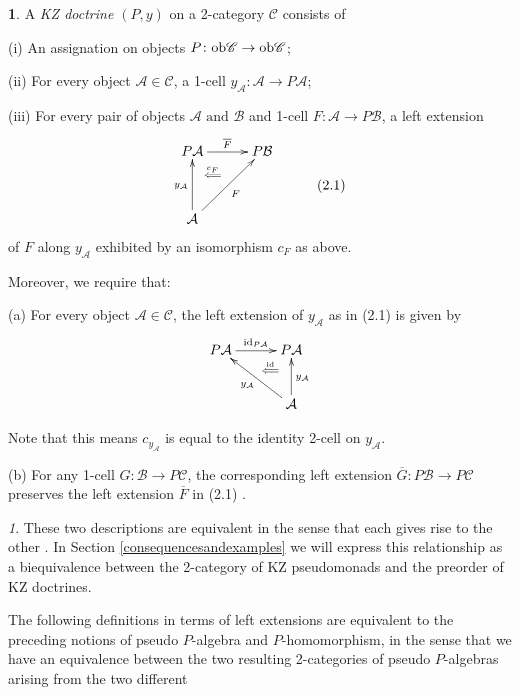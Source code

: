 \documentclass[a4paper,oneside,english]{amsart}
\numberwithin{equation}{section}
\numberwithin{figure}{section}
\theoremstyle{plain}
\theoremstyle{definition}
\newtheorem{defn}[thm]{\protect\definitionname}
\theoremstyle{remark}
\newtheorem{rem}[thm]{\protect\remarkname}
\theoremstyle{definition}
\theoremstyle{plain}
\theoremstyle{plain}
\theoremstyle{plain}
\providecommand{\definitionname}{Definition}
\providecommand{\remarkname}{Remark}
\begin{document}
\begin{defn}
\cite[Definition 3.1]{marm2012} A \emph{KZ doctrine $\left(P,y\right)$
}on a 2-category $\mathscr{C}$ consists of 

(i) An assignation on objects $P\colon\textnormal{ob}\mathscr{C}\to\textnormal{ob}\mathscr{C}$;

(ii) For every object $\mathcal{A}\in\mathscr{C}$, a 1-cell $y_{\mathcal{A}}\colon\mathcal{A}\to P\mathcal{A}$;

(iii) For every pair of objects $\mathcal{A}\text{ and }\mathcal{B}$
and 1-cell $F\colon\mathcal{A}\to P\mathcal{B}$, a left extension
\[
\xymatrix@=1em{P\mathcal{A}\ar@{->}[rr]^{\overline{F}}\ar@{}[rd]|-{\stackrel{c_{F}}{\Longleftarrow}} &  & P\mathcal{B}\\
 & \; &  &  & (2.1)\\
\mathcal{A}\ar[rruu]_{F}\ar[uu]^{y_{\mathcal{A}}}
}
\]
of $F$ along $y_{\mathcal{A}}$ exhibited by an isomorphism $c_{F}$
as above. 

Moreover, we require that:

(a) For every object $\mathcal{A}\in\mathscr{C}$, the left extension
of $y_{\mathcal{A}}$ as in (2.1) is given by
\[
\xymatrix@=1em{P\mathcal{A}\ar@{->}[rr]^{\textnormal{id}_{P\mathcal{A}}} &  & P\mathcal{A}\ar@{}[ld]|-{\stackrel{\textnormal{id}}{\Longleftarrow}}\\
 & \;\\
 &  & \mathcal{A}\ar[uu]_{y_{\mathcal{A}}}\ar[ulul]^{y_{\mathcal{A}}}
}
\]

Note that this means $c_{y_{\mathcal{A}}}$ is equal to the identity
2-cell on $y_{\mathcal{A}}$. 

(b) For any 1-cell $G\colon\mathcal{B}\to P\mathcal{C}$, the corresponding
left extension $\overline{G}\colon P\mathcal{B}\to P\mathcal{C}$
preserves the left extension $\overline{F}$ in (2.1) .\end{defn}
\begin{rem}
These two descriptions are equivalent in the sense that each gives
rise to the other \cite{marm2012,marm1997}. In Section \ref{consequencesandexamples}
we will express this relationship as a biequivalence between the 2-category
of KZ pseudomonads and the preorder of KZ doctrines.
\end{rem}
The following definitions in terms of left extensions are equivalent
to the preceding notions of pseudo $P$-algebra and $P$-homomorphism,
in the sense that we have an equivalence between the two resulting
2-categories of pseudo $P$-algebras arising from the two different
\end{document}
